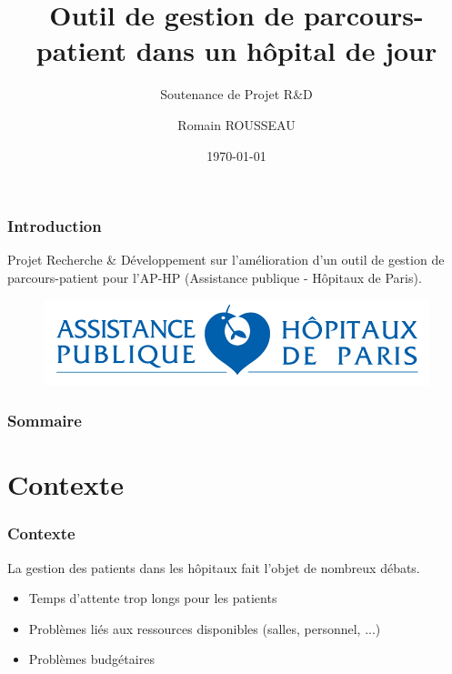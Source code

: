 \documentclass{beamer}
\title[Outil de gestion de parcours-patient]{Outil de gestion de parcours-patient dans un hôpital de jour}
\subtitle{Soutenance de Projet R\&D}
\author{Romain ROUSSEAU}
\date{\today}
\begin{document}
	
\begin{frame}[plain]
	\titlepage
\end{frame}


\begin{frame}[plain]
\frametitle{Introduction}

Projet Recherche \& Développement sur l'amélioration d'un outil de gestion de parcours-patient pour l'AP-HP (Assistance publique - Hôpitaux de Paris).

\begin{figure}
	\includegraphics[scale=0.7]{images/LOGO_APHP}
\end{figure}

\end{frame}


\begin{frame}

\frametitle{Sommaire}

\tableofcontents

\end{frame}

\section[Contexte]{Contexte}

\begin{frame}
\frametitle{Contexte}

La gestion des patients dans les hôpitaux fait l'objet de nombreux débats.

\bigbreak

\begin{itemize}
	\item Temps d'attente trop longs pour les patients
	\item Problèmes liés aux ressources disponibles (salles, personnel, ...) 
	\item Problèmes budgétaires
\end{itemize}

\end{frame}
\end{document}
